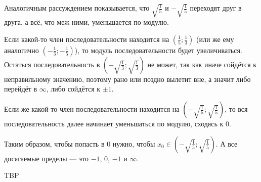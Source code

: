 \documentclass[12pt,a4paper]{article}
\begin{document}
\begin{enumproblem}[\textcolor{green}{сдано}]
        \begin{remark}
            Аналогичным рассуждением показывается, что $\sqrt{\frac{1}{5}}$ и $-\sqrt{\frac{1}{5}}$ переходят друг в друга, а всё, что меж ними, уменьшается по модулю.
        \end{remark}

        \begin{corollary}
            Если какой-то член последовательности находится на $(\frac{1}{5}; \frac{1}{3})$ (или же ему аналогично $(-\frac{1}{3}; -\frac{1}{5})$), то модуль последовательности будет увеличиваться. Остаться последовательность в $(-\sqrt{\frac{1}{3}};\sqrt{\frac{1}{3}})$ не может, так как иначе сойдётся к неправильному значению, поэтому рано или поздно вылетит вне, а значит либо перейдёт в $\infty$, либо сойдётся к $\pm 1$.
        \end{corollary}

        \begin{corollary}
            Если же какой-то член последовательности находится на $(-\sqrt{\frac{1}{5}}; \sqrt{\frac{1}{5}})$, то вся последовательность далее начинает уменьшаться по модулю, сходясь к $0$. 
        \end{corollary}

        Таким образом, чтобы попасть в $0$ нужно, чтобы $x_0 \in (-\sqrt{\frac{1}{5}}; \sqrt{\frac{1}{5}})$. А все досягаемые пределы --- это $-1$, $0$, $-1$ и $\infty$.
    \end{enumproblem}

    \begin{enumproblem}
        TBP
    \end{enumproblem}
\end{document}
